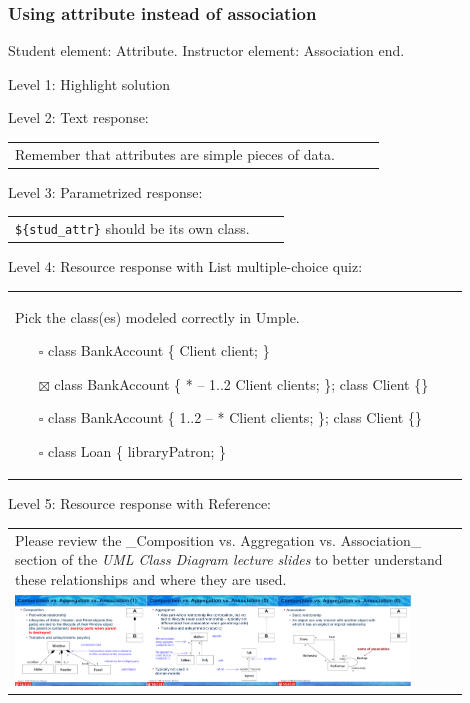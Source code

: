 \subsubsection{Using attribute instead of association}

Student element: Attribute. Instructor element: Association end. \medskip

\noindent Level 1: Highlight solution  \medskip

\noindent Level 2: Text response: \medskip

\begin{tabular}{|p{0.9\linewidth}}
Remember that attributes are simple pieces of data.
\end{tabular} \medskip

\noindent Level 3: Parametrized response: \medskip

\begin{tabular}{|p{0.9\linewidth}}
\verb|${stud_attr}| should be its own class.
\end{tabular} \medskip

\noindent Level 4: Resource response with List multiple-choice quiz: \medskip

\begin{tabular}{|p{0.9\linewidth}}

Pick the class(es) modeled correctly in Umple.

\begin{itemize}
    \item[$\square$] class BankAccount \{ Client client; \}
    \item[$\boxtimes$] class BankAccount \{ * -- 1..2 Client clients; \}; class Client \{\}
    \item[$\square$] class BankAccount \{ 1..2 -- * Client clients; \}; class Client \{\}
    \item[$\square$] class Loan \{ libraryPatron; \}
\end{itemize}

\end{tabular} \medskip

\noindent Level 5: Resource response with Reference: \medskip

\begin{tabular}{|p{0.9\linewidth}}
Please review the _Composition vs. Aggregation vs. Association_ section of 
the \textit{UML Class Diagram lecture slides} to 
better understand these relationships and where they are used.

\\
\includegraphics[width=0.9\textwidth]{images/composition_aggregation_association.png}
\end{tabular} \medskip


